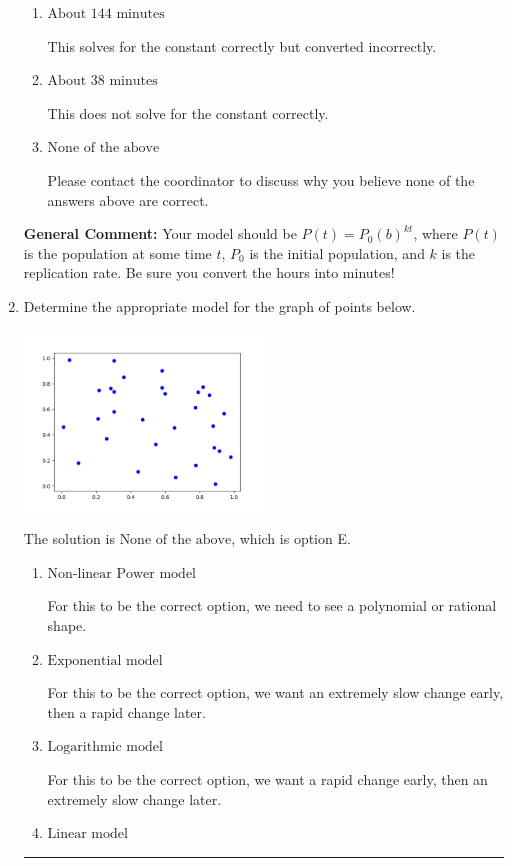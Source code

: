\documentclass{extbook}[14pt]
\newcommand{\litem}[1]{\item #1

\rule{\textwidth}{0.4pt}}
\begin{document}
\begin{enumerate}
{\begin{enumerate}[label=\Alph*.]
* This is the correct option.
\item \( \text{About } 144 \text{ minutes} \)

This solves for the constant correctly but converted incorrectly.
\item \( \text{About } 38 \text{ minutes} \)

This does not solve for the constant correctly.
\item \( \text{None of the above} \)

Please contact the coordinator to discuss why you believe none of the answers above are correct.
\end{enumerate}

\textbf{General Comment:} Your model should be $P(t) = P_0(b)^{kt}$, where $P(t)$ is the population at some time $t$, $P_0$ is the initial population, and $k$ is the replication rate. Be sure you convert the hours into minutes!
}
\litem{
Determine the appropriate model for the graph of points below.

\begin{center}
    \includegraphics[width=0.5\textwidth]{../Figures/identifyModelGraph11B.png}
\end{center}




The solution is \( \text{None of the above} \), which is option E.\begin{enumerate}[label=\Alph*.]
\item \( \text{Non-linear Power model} \)

For this to be the correct option, we need to see a polynomial or rational shape.
\item \( \text{Exponential model} \)

For this to be the correct option, we want an extremely slow change early, then a rapid change later.
\item \( \text{Logarithmic model} \)

For this to be the correct option, we want a rapid change early, then an extremely slow change later.
\item \( \text{Linear model} \)


\end{enumerate}}
\end{enumerate}
\end{document}
